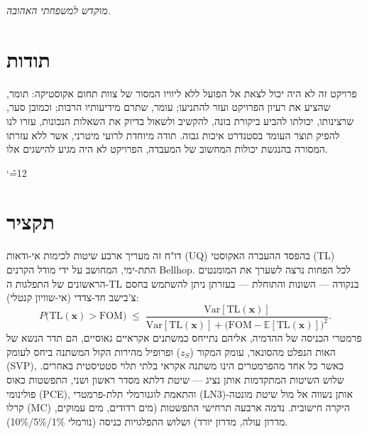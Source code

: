 \documentclass[12pt,a4paper]{article}
\newcommand{\EX}{\mathbb{E}}
\newcommand{\Var}{\mathrm{Var}}
\newcommand{\TL}{\mathrm{TL}}
\begin{document}
\thispagestyle{empty}
\vspace*{5cm}
\begin{center}\textit{מוקדש למשפחתי האהובה.}\end{center}
\newpage

\thispagestyle{empty}
\section*{תודות}

פרויקט זה לא היה יכול לצאת אל הפועל ללא ליוויו המסור של צוות תחום אקוסטיקה: תומר, שהציע את רעיון הפרויקט ועזר להתניעו; עומר, שתרם מידיעותיו הרבות; וכמובן סער, שרצינותו, יכולתו להביע ביקורת בונה, להקשיב ולשאול בדיוק את השאלות הנכונות, עזרו לנו להפיק תוצר העומד בסטנדרט איכות גבוה. תודה מיוחדת לרועי מיטרני, אשר ללא עזרתו המסורה בהנגשת יכולות המחשוב של המעבדה, הפרויקט לא היה מגיע להישגים אלו.
\newpage

\tableofcontents
\newpage
{\catcode`\^=12\relax\listoffigures}
\newpage

\section*{תקציר}

דו"ח זה מעריך ארבע שיטות לכימות אי-ודאות (\textenglish{UQ}) בהפסד ההעברה האקוסטי
(\textenglish{TL}) התת-ימי, המחושב על ידי מודל הקרנים \textenglish{Bellhop}.
לכל הפחות נרצה לשערך את המומנטים הראשונים של התפלגות ה-\textenglish{TL} בנקודה —
השונות והתוחלת — בעזרתן ניתן להשתמש בחסם צ'בישב חד-צדדי (אי-שוויון קנטלי):
\begin{equation}
  P\!\bigl(\TL(\mathbf{x}) > \mathrm{FOM}\bigr)
  \;\leq\;
  \frac{\Var[\TL(\mathbf{x})]}{\Var[\TL(\mathbf{x})] + \bigl(\mathrm{FOM} - \EX[\TL(\mathbf{x})]\bigr)^2}.
  \label{eq:cantelli}
\end{equation}
פרמטרי הכניסה של ההדמיה, אליהם נתייחס כמשתנים אקראיים גאוסיים, הם תדר הנשא של האות הנפלט מהסונאר, עומק המקור ($z_S$) ופרופיל מהירות הקול המשתנה ביחס לעומק (\textenglish{SVP}),
כאשר כל אחד מהפרמטרים הינו משתנה אקראי בלתי תלוי סטטיסטית באחרים.
שלוש השיטות המתקדמות אותן נציג — שיטת דלתא מסדר ראשון ושני, התפשטות כאוס פולינומי (\textenglish{PCE}),
והתאמת לוגנורמלי תלת-פרמטרי (\textenglish{LN3})-אותן נשווה אל מול שיטת מונטה קרלו (\textenglish{MC}) היקרה חישובית.
 נדמה ארבעה תרחישי התפשטות (מים רדודים, מים עמוקים, מדרון עולה, מדרון יורד) ושלוש התפלגויות כניסה (נורמלי 1\%{}/5\%{}/10\%{}).
\end{document}
